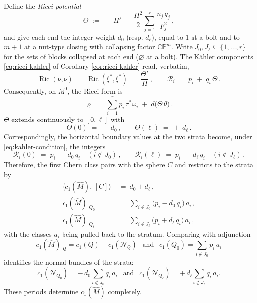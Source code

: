 \documentclass[11pt]{amsart}
\theoremstyle{plain}
\numberwithin{equation}{section}
\newtheorem{proposition}[theorem]{Proposition}
\theoremstyle{definition}
\theoremstyle{remark}
\begin{document}
Define the \emph{Ricci potential}
	\[
	\Theta \;:=\; -\,H' \;-\; \frac{H^2}{2} \sum_{j=1}^r \frac{n_j\, q_j}{F_j^2} \,,
	\]
and give each end the integer weight $d_0$ (resp. $d_\ell$), equal to $1$ at a bolt and to $m + 1$ at a nut-type closing with collapsing factor $\mathbb{CP}^m$. Write $J_0, J_\ell \subseteq \{ 1, \dots, r \}$ for the sets of blocks collapsed at each end ($\varnothing$ at a bolt). The K\"{a}hler components \eqref{eq:ricci-kahler} of Corollary \ref{cor:ricci-kahler} read, verbatim,
	\[
	\operatorname{Ric}(\nu, \nu) \;=\; \operatorname{Ric}(\xi^*, \xi^*) \;=\; \frac{\Theta'}{H} \,, \qquad \mathcal{R}_i \;=\; p_i \;+\; q_i\, \Theta \,.
	\]
Consequently, on $M^0$, the Ricci form is
	\[
	\varrho \;=\; \sum_{i=1}^r p_i\, \pi^* \omega_i \;+\; d \big( \Theta\, \theta \big) \,.
	\]
	$\Theta$ extends continuously to $[0, \ell]$ with
		\[
	\Theta(0) \;=\; -\, d_0 \,, \qquad \Theta(\ell) \;=\; +\, d_\ell \,.
	\]
	Correspondingly, the horizontal boundary values at the two strata become, under \eqref{eq:kahler-condition}, the {integers}
		\[
	\mathcal{R}_i(0) \;=\; p_i \;-\; d_0\, q_i \quad ( i \notin J_0 ) \,, \qquad \mathcal{R}_i(\ell) \;=\; p_i \;+\; d_\ell\, q_i \quad ( i \notin J_\ell ) \,.
	\]
	Therefore, the first Chern class pairs with the sphere $C$ and restricts to the strata by
		\begin{align*}
				\big\langle c_1(\widehat{M}),\, [C] \big\rangle &\;=\; d_0 + d_\ell \,, \\
			c_1(\widehat{M}) \big|_{Q_0} &\;=\; \sum_{i \notin J_0} \big( p_i - d_0\, q_i \big)\, a_i \,, \\
			c_1(\widehat{M}) \big|_{Q_\ell} &\;=\; \sum_{i \notin J_\ell} \big( p_i + d_\ell\, q_i \big)\, a_i \,,
	\end{align*}
	with the classes $a_i$ being pulled back to the stratum. Comparing with adjunction 
	$$c_1(\widehat{M})|_Q = c_1(Q) + c_1(\mathcal{N}_Q)~~ \text{ and } ~~c_1(Q_0) = \sum_{i \notin J_0} p_i\, a_i$$
	identifies the normal bundles of the strata: 
	$$c_1(\mathcal{N}_{Q_0}) = -\, d_0 \sum_{i \notin J_0} q_i\, a_i ~~\text{ and  } ~~c_1(\mathcal{N}_{Q_\ell}) = +\, d_\ell \sum_{i \notin J_\ell} q_i\, a_i.$$
	These periods determine $c_1(\widehat{M})$ completely.
	
\end{document}
